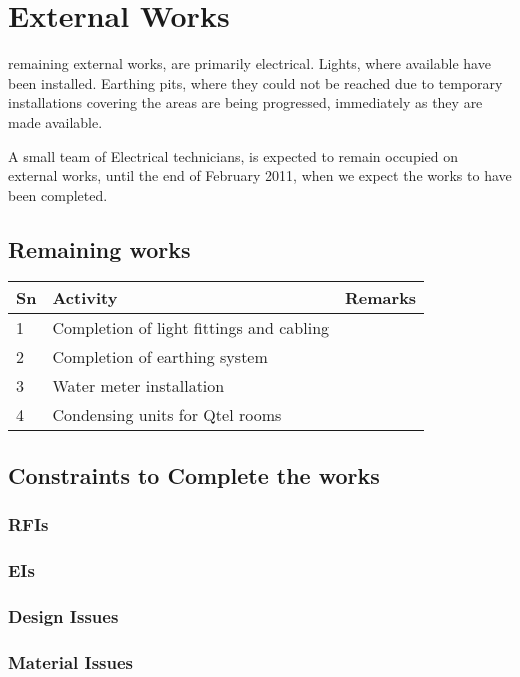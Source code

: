 \chapter{External Works}

 remaining external works, are primarily electrical. Lights, where available have been
installed. Earthing pits, where they could not be reached due to temporary installations covering the areas
are being progressed, immediately as they are made available.

A small team of Electrical technicians, is expected to remain occupied on external works, until the end of February 2011, when we expect the works to have been completed.

\section{Remaining works}

\begin{table*}
\RaggedRight
\begin{tabular}{lp{3.5cm}p{3.5cm}}
\toprule
Sn &Activity &Remarks\\
\midrule
1  & Completion of light fittings and cabling &\\
2  & Completion of earthing system & \\
3  & Water meter installation&\\
4  & Condensing units for Qtel rooms\\
\bottomrule
\end{tabular}
\end{table*}

\section{Constraints to Complete the works}
\subsection{RFIs}
\subsection{EIs}
\subsection{Design Issues}
\subsection{Material Issues}
